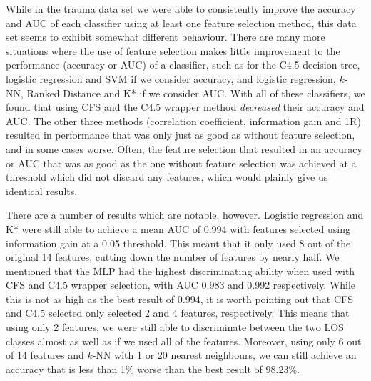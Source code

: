 While in the trauma data set we were able to consistently improve the accuracy
and AUC of each classifier using at least one feature selection method,
this data set seems to exhibit somewhat different
behaviour. There are many more situations where the use of feature selection
makes little improvement to the performance (accuracy or AUC) of a classifier,
such as for the C4.5 decision tree, logistic regression and SVM if we consider
accuracy, and logistic regression, $k$-NN, Ranked Distance and K* if we
consider AUC. With all of these classifiers, we found that using CFS and the
C4.5 wrapper method \textit{decreased} their accuracy and AUC. The other three
methods (correlation coefficient, information gain and 1R) resulted in
performance that was only just as good as without feature selection, and in
some cases worse. Often, the feature selection that resulted in an accuracy
or AUC that was as good as the one without feature selection was achieved at
a threshold which did not discard any features, which would plainly give us
identical results.

There are a number of results which are notable, however. Logistic regression
and K*
were still able to achieve a mean AUC of 0.994 with features selected using
information gain at a 0.05 threshold. This meant that it only used 8 out of
the original 14 features, cutting down the number of features by nearly half.
We mentioned that the MLP had the highest discriminating ability when used with
CFS and C4.5 wrapper selection, with AUC 0.983 and 0.992 respectively. While
this is not as high as the best result of 0.994, it is worth pointing out that
CFS and C4.5 selected only selected 2 and 4 features, respectively. This means that
using only 2 features, we were still able to discriminate between the two LOS
classes almost as well as if we used all of the features. Moreover, using
only 6 out of 14 features and $k$-NN with 1 or 20 nearest neighbours, we can
still achieve an accuracy that is less than 1\% worse than the best result
of 98.23\%.

